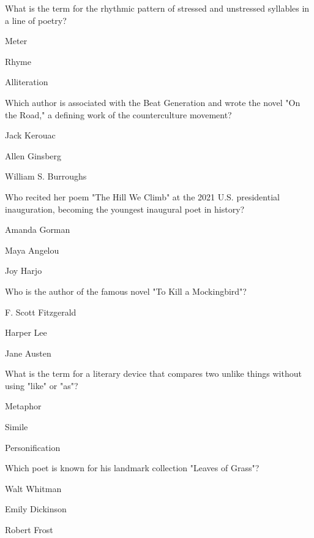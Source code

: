 \begin{enhancedmcq}{What is the term for the rhythmic pattern of stressed and unstressed syllables in a line of poetry?}
\item Meter
\item Rhyme
\item Alliteration

\end{enhancedmcq}
\begin{enhancedmcq}{Which author is associated with the Beat Generation and wrote the novel "On the Road," a defining work of the counterculture movement?}
\item Jack Kerouac
\item Allen Ginsberg
\item William S. Burroughs

\end{enhancedmcq}
\begin{enhancedmcq}{Who recited her poem "The Hill We Climb" at the 2021 U.S. presidential inauguration, becoming the youngest inaugural poet in history?}
\item Amanda Gorman
\item Maya Angelou
\item Joy Harjo

\end{enhancedmcq}
\begin{enhancedmcq}{Who is the author of the famous novel "To Kill a Mockingbird"?}
\item F. Scott Fitzgerald
\item Harper Lee
\item Jane Austen

\end{enhancedmcq}
\begin{enhancedmcq}{What is the term for a literary device that compares two unlike things without using "like" or "as"?}
\item Metaphor
\item Simile
\item Personification

\end{enhancedmcq}
\begin{enhancedmcq}{Which poet is known for his landmark collection "Leaves of Grass"?}
\item Walt Whitman
\item Emily Dickinson
\item Robert Frost

\end{enhancedmcq}
